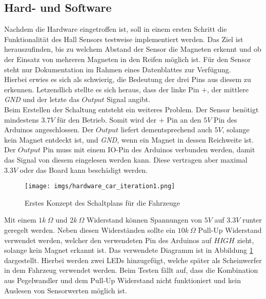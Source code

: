 \documentclass[.../Dokumentation.tex]{subfiles}
\begin{document}
\subsection{Hard- und Software}
\label{sec-ita1-hardware}
Nachdem die Hardware eingetroffen ist, soll in einem ersten Schritt 
die Funktionalität des Hall Sensors testweise implementiert werden. Das Ziel 
ist herauszufinden, bis zu welchem Abstand der Sensor die Magneten erkennt und 
ob der Einsatz von mehreren Magneten in den Reifen möglich ist. Für den Sensor 
steht nur Dokumentation im Rahmen eines Datenblattes zur Verfügung.\\
Hierbei erwies es sich als schwierig, die Bedeutung der drei Pins aus diesem zu 
erkennen. Letzendlich stellte es sich heraus, dass der linke Pin $+$, der 
mittlere \textit{GND} und der letzte das $Output$ Signal angibt.\\
Beim Erstellen der Schaltung entsteht ein weiteres Problem. Der Sensor benötigt 
mindestens $3.7V$ für den Betrieb. Somit wird der $+$ Pin an den $5V$ Pin des 
Arduinos angeschlossen. Der $Output$ liefert dementsprechend auch $5V$, solange 
kein Magnet entdeckt ist, und \textit{GND}, wenn ein Magnet in dessen Reichweite ist. 
Der $Output$ Pin muss mit einem IO-Pin des Arduinos verbunden werden, damit das 
Signal von diesem eingelesen werden kann. Diese vertragen aber maximal $3.3V$ 
oder das Board kann beschädigt werden.
\begin{figure}[H]
\begin{center}
    \texttt{[image: imgs/hardware\_car\_iteration1.png]}
    \caption{Erstes Konzept des Schaltplans für die Fahrzeuge}
    \label{fig-hardware-car-iteration1}
\end{center}
\end{figure}
\noindent
Mit einem $1k\ \Omega$ und $2k\ \Omega$ Widerstand können Spannungen von $5V$ 
auf $3.3V$ runter geregelt werden. Neben diesen Widerständen sollte ein 
$10k\ \Omega$ Pull-Up Widerstand verwendet werden, welcher den verwendeten Pin 
des Arduinos auf $HIGH$ zieht, solange kein Magnet erkannt ist. Das verwendete 
Diagramm ist in Abbildung \ref{fig-hardware-car-iteration1} dargestellt. 
Hierbei werden zwei LEDs hinzugefügt, welche später als Scheinwerfer in 
dem Fahrzeug verwendet werden. Beim Testen fällt auf, dass die Kombination aus 
Pegelwandler und dem Pull-Up Widerstand nicht funktioniert und kein Auslesen 
von Sensorwerten möglich ist.
\end{document}
